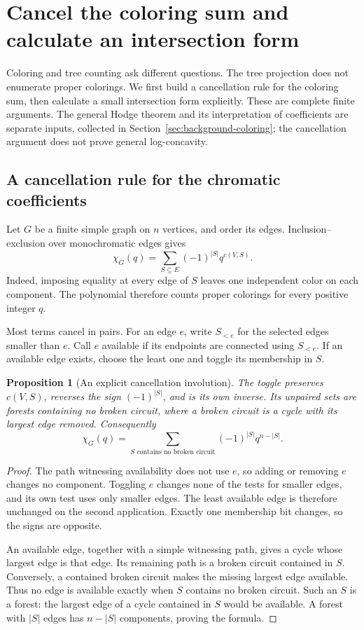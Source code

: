 \documentclass[11pt]{article}
\newtheorem{proposition}[theorem]{Proposition}
\theoremstyle{definition}
\theoremstyle{remark}
\begin{document}
\section{Cancel the coloring sum and calculate an intersection form}
\label{sec:graph-matroid-hodge}

Coloring and tree counting ask different questions. The tree projection does not enumerate proper colorings. We first build a cancellation rule for the coloring sum, then calculate a small intersection form explicitly. These are complete finite arguments. The general Hodge theorem and its interpretation of coefficients are separate inputs, collected in Section~\ref{sec:background-coloring}; the cancellation argument does not prove general log-concavity.

\subsection{A cancellation rule for the chromatic coefficients}
\label{sec:broken-circuit-calculus}

Let $G$ be a finite simple graph on $n$ vertices, and order its edges. Inclusion--exclusion over monochromatic edges gives
\[
 \chi_G(q)=\sum_{S\subseteq E}(-1)^{|S|}q^{c(V,S)}.
\]
Indeed, imposing equality at every edge of $S$ leaves one independent color on each component. The polynomial therefore counts proper colorings for every positive integer $q$.

Most terms cancel in pairs. For an edge $e$, write $S_{<e}$ for the selected edges smaller than $e$. Call $e$ available if its endpoints are connected using $S_{<e}$. If an available edge exists, choose the least one and toggle its membership in $S$.

\begin{proposition}[An explicit cancellation involution]
\label{prop:broken-circuit-involution}
The toggle preserves $c(V,S)$, reverses the sign $(-1)^{|S|}$, and is its own inverse. Its unpaired sets are forests containing no broken circuit, where a broken circuit is a cycle with its largest edge removed. Consequently
\[
 \chi_G(q)=\sum_{S\text{ contains no broken circuit}}
             (-1)^{|S|}q^{n-|S|}.
\]
\end{proposition}
\begin{proof}
The path witnessing availability does not use $e$, so adding or removing $e$ changes no component. Toggling $e$ changes none of the tests for smaller edges, and its own test uses only smaller edges. The least available edge is therefore unchanged on the second application. Exactly one membership bit changes, so the signs are opposite.

An available edge, together with a simple witnessing path, gives a cycle whose largest edge is that edge. Its remaining path is a broken circuit contained in $S$. Conversely, a contained broken circuit makes the missing largest edge available. Thus no edge is available exactly when $S$ contains no broken circuit. Such an $S$ is a forest: the largest edge of a cycle contained in $S$ would be available. A forest with $|S|$ edges has $n-|S|$ components, proving the formula.
\end{proof}
\end{document}
